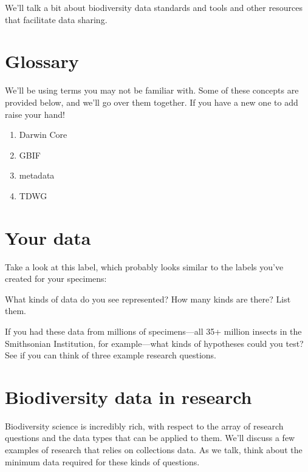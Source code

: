 \noindent{}We'll talk a bit about biodiversity data standards and tools and other resources that facilitate data sharing. 

\section*{Glossary}
We'll be using terms you may not be familiar with. Some of these concepts are provided below, and we'll go over them together. If you have a new one to add raise your hand!
\begin{enumerate} 
\item {Darwin Core}
\item {GBIF}
\item {metadata}
\item{TDWG} 
\end{enumerate}

\section*{Your data}
Take a look at this label, which probably looks similar to the labels you've created for your specimens:\vspace{3mm}

\begin{labelfontsmall}
\tiny
{}
\end{labelfontsmall}
\normalsize\vspace{5mm}

\begin{theo}[systematics7] 
{}What kinds of data do you see represented? How many kinds are there? List them.\vspace{3mm}

\noindent{}If you had these data from millions of specimens---all 35+ million insects in the Smithsonian Institution, for example---what kinds of hypotheses could you test? See if you can think of three example research questions.
\end{theo}

\section*{Biodiversity data in research}
Biodiversity science is incredibly rich, with respect to the array of research questions and the data types that can be applied to them. We'll discuss a few examples of research that relies on collections data. As we talk, think about the minimum data required for these kinds of questions.

